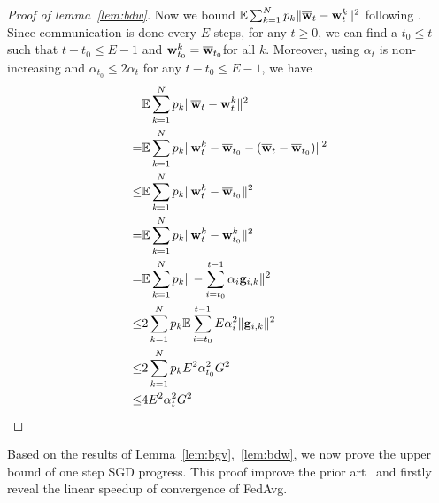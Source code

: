 \begin{proof}[Proof of lemma~\ref{lem:bdw}]
	Now we bound $\mathbb{E}\sum_{k=1}^{N}p_{k}\|{\overline{\mathbf{w}}}_{t}-{\mathbf{w}}_{t}^{k}\|^{2}$ following \cite{li2019convergence}.
	Since communication is done every $E$ steps, for any $t\geq0$, we
	can find a $t_{0}\leq t$ such that $t-t_{0}\leq E-1$ and ${\mathbf{w}}_{t_{0}}^{k}={\overline{\mathbf{w}}}_{t_{0}}$for
	all $k$. Moreover, using $\alpha_{t}$ is non-increasing and $\alpha_{t_{0}}\leq2\alpha{}_{t}$
	for any $t-t_{0}\leq E-1$, we have 
		\begin{align*}
	& \mathbb{E}\sum_{k=1}^{N}p_{k}\|{\overline{\mathbf{w}}}_{t}-{\mathbf{w}}_{t}^{k}\|^{2}\\
= & \mathbb{E}\sum_{k=1}^{N}p_{k}\|{\mathbf{w}}_{t}^{k}-{\overline{\mathbf{w}}}_{t_{0}}-({\overline{\mathbf{w}}}_{t}-{\overline{\mathbf{w}}}_{t_{0}})\|^{2}\\
\leq &\mathbb{E}\sum_{k=1}^{N}p_{k}\|{\mathbf{w}}_{t}^{k}-{\overline{\mathbf{w}}}_{t_{0}}\|^{2}\\
	= &\mathbb{E}\sum_{k=1}^{N}p_{k}\|{\mathbf{w}}_{t}^{k}-{\mathbf{w}}_{t_{0}}^{k}\|^{2}\\
	= &\mathbb{E}\sum_{k=1}^{N}p_{k}\|-\sum_{i=t_{0}}^{t-1}\alpha_{i}{\mathbf{g}}_{i,k}\|^{2}\\
	\leq & 2\sum_{k=1}^{N}p_{k}\mathbb{E}\sum_{i=t_{0}}^{t-1}E\alpha_{i}^{2}\|{\mathbf{g}}_{i,k}\|^{2}\\
	\leq & 2\sum_{k=1}^{N}p_{k}E^{2}\alpha_{t_{0}}^{2}G^{2}\\
	\leq & 4E^{2}\alpha_{t}^{2}G^{2}
	\end{align*}
\end{proof}
Based on the results of Lemma~\ref{lem:bgv},~\ref{lem:bdw}, we now prove the upper bound of one step SGD progress. This 
proof improve the prior art~\cite{li2019convergence} and firstly reveal the linear speedup of convergence of FedAvg. 
